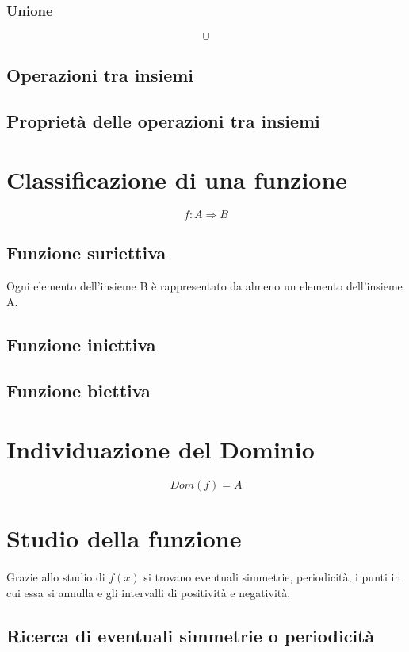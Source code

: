 \documentclass[a4paper,14pt]{extarticle}
\begin{document}
\subsubsection{Unione}
\[ \cup \]

\subsection{Operazioni tra insiemi}

\subsection{Proprietà delle operazioni tra insiemi}

\section{Classificazione di una funzione}
\[ f: A \Rightarrow B \]
\subsection{Funzione suriettiva}
Ogni elemento dell'insieme B è rappresentato da almeno un elemento dell'insieme A.

\subsection{Funzione iniettiva}

\subsection{Funzione biettiva}

\section{Individuazione del Dominio}
\[ Dom(f) = A\]
\section{Studio della funzione}
\paragraph{}
Grazie allo studio di $f(x)$ si trovano eventuali simmetrie, periodicità, i punti in cui essa si annulla e gli intervalli di positività e negatività.
\subsection{Ricerca di eventuali simmetrie o periodicità}
\end{document}
